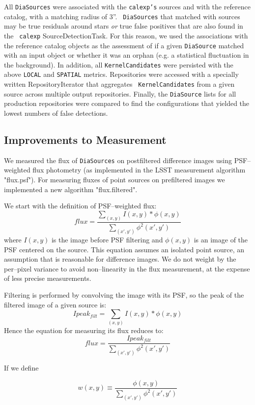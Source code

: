 \documentclass[prd, nofootinbib, floatfix, 11pt,tightenlines,times]{article}
\begin{document}
All {\tt DiaSources} were associated with the {\tt calexp's} sources
and with the reference catalog, with a matching radius of 3''.  {\tt
  DiaSources} that matched with sources may be true residuals around
stars {\it or} true false positives that are also found in the {\tt
  calexp} SourceDetectionTask.  For this reason, we used the
associations with the reference catalog objects as the assessment of
if a given {\tt DiaSource} matched with an input object or whether it
was an orphan (e.g. a statistical fluctuation in the background).  In
addition, all {\tt KernelCandidates} were persisted with the above
{\tt LOCAL} and {\tt SPATIAL} metrics.  Repositories were accessed
with a specially written RepositoryIterator that aggregates {\tt
  KernelCandidates} from a given source across multiple output
repositories.  Finally, the {\tt DiaSource} lists for all production
repositories were compared to find the configurations that yielded the
lowest numbers of false detections.

\subsection{Improvements to Measurement \label{sec-meas}}

We measured the flux of {\tt DiaSources} on postfiltered difference images
using PSF--weighted flux photometry (as implemented in the LSST
measurement algorithm "flux.psf").  For measuring fluxes of point
sources on prefiltered images we implemented a new algorithm
"flux.filtered".

We start with the definition of PSF--weighted flux:
%
\[flux = \frac{\sum_{(x,y)}I(x,y) * \phi(x,y)}{\sum_{(x',y')}\phi^2(x',y')}\]
%
where $I(x,y)$ is the image before PSF filtering and $\phi(x,y)$ is an
image of the PSF centered on the source. This equation assumes an
isolated point source, an assumption that is reasonable for difference
images.  We do not weight by the per--pixel variance to avoid
non--linearity in the flux measurement, at the expense of less precise
measurements.

Filtering is performed by convolving the image with its PSF, so the
peak of the filtered image of a given source is:
%
\[Ipeak_{filt} = \sum_{(x,y)}I(x,y) * \phi(x,y)\]
%
Hence the equation for measuring its flux reduces to:
%
\[flux = \frac{Ipeak_{filt}}{\sum_{(x',y')}\phi^2(x',y')}\]

If we define 

\[w(x,y) \equiv \frac{\phi(x,y)}{\sum_{(x',y')}\phi^2(x',y')}\]
\end{document}
